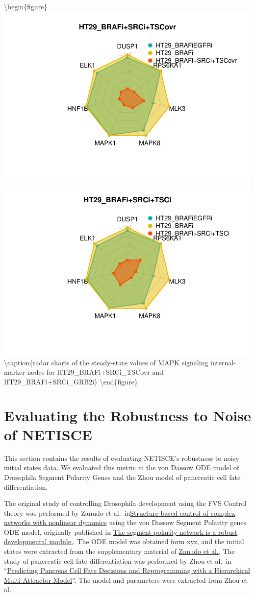 \documentclass[
]{book}
\begin{document}
\textbackslash begin\{figure\}
\includegraphics[width=0.5\linewidth]{_main_files/figure-latex/crc-chartsmapk-1} \includegraphics[width=0.5\linewidth]{_main_files/figure-latex/crc-chartsmapk-2} \textbackslash caption\{radar charts of the steady-state values of MAPK signaling internal-marker nodes for HT29\_BRAFi+SRCi\_TSCovr and HT29\_BRAFi+SRCi\_GRB2i\}\label{fig:crc-chartsmapk}
\textbackslash end\{figure\}

\hypertarget{evaluating-the-robustness-to-noise-of-netisce}{%
\chapter{Evaluating the Robustness to Noise of NETISCE}\label{evaluating-the-robustness-to-noise-of-netisce}}

This section contains the results of evaluating NETISCE's robustness to noisy initial states data. We evaluated this metric in the von Dassow ODE model of Drosophila Segment Polarity Genes and the Zhou model of pancreatic cell fate differentiation.

The original study of controlling Drosophila development using the FVS Control theory was performed by Zanudo et al.~in\href{https://www.pnas.org/doi/10.1073/pnas.1617387114}{Structure-based control of complex networks with nonlinear dynamics} using the von Dassow Segment Polarity genes ODE model, originally published in \href{https://www.nature.com/articles/35018085}{The segment polarity network is a robust developmental module.}. The ODE model was obtained form xyz, and the initial states were extracted from the supplementary material of \href{link}{Zanudo et al.}. The study of pancreatic cell fate differentiation was performed by Zhou et al.~in ``\href{https://journals.plos.org/plosone/article?id=10.1371/journal.pone.0014752}{Predicting Pancreas Cell Fate Decisions and Reprogramming with a Hierarchical Multi-Attractor Model}''. The model and parameters were extracted from Zhou et al.
\end{document}
